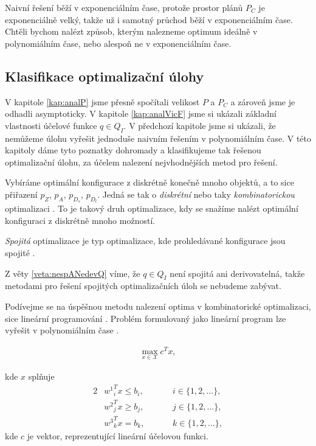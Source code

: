 Naivní řešení běží v exponenciálním čase, protože prostor plánů $P_C$ je exponenciálně velký, takže už i samotný průchod běží v exponenciálním čase.
Chtěli bychom nalézt způsob, kterým nalezneme optimum ideálně v polynomiálním čase, nebo alespoň ne v exponenciálním čase.

\subsection{Klasifikace optimalizační úlohy}\label{kap:NP}

V kapitole \ref{kap:analP} jsme přesně spočítali velikost $P$ a $P_C$ a zároveň jsme je odhadli asymptoticky.
V kapitole \ref{kap:analVicF} jsme si ukázali základní vlastnosti účelové funkce $q \in Q_I$.
V předchozí kapitole jsme si ukázali, že nemůžeme úlohu vyřešit jednoduše naivním řešením v polynomiálním čase.
V této kapitoly dáme tyto poznatky dohromady a klasifikujeme tak řešenou optimalizační úlohu, za účelem nalezení nejvhodnějších metod pro řešení.

Vybíráme optimální konfigurace z diskrétně konečně mnoho objektů, a to sice přiřazení $p_Z$, $p_A$, $p_{D_{s}}$, $p_{D_{l}}$.
Jedná se tak o \textit{diskrétní} nebo taky \textit{kombinatorickou} optimalizaci \cite{discrete}.
To je takový druh optimalizace, kdy se snažíme nalézt optimální konfiguraci z diskrétně mnoho možností.

\textit{Spojitá} optimalizace je typ optimalizace, kde prohledávané konfigurace jsou spojité \cite{continuos}.

Z věty \ref{veta:nespANedevQ} víme, že $q \in Q_I$ není spojitá ani derivovatelná, takže metodami pro řešení spojitých optimalizačních úloh se nebudeme zabývat.

Podívejme se na úspěšnou metodu nalezení optima v kombinatorické optimalizaci, sice lineární programování \cite{LP}.
Problém formulovaný jako lineární program lze vyřešit v polynomiálním čase \cite{cohen2020solving}.

\begin{definice}
  \begin{align*}
    \max_{x \in \mathcal{X}} c^T x,
  \end{align*}

  kde $x$ splňuje
  \begin{alignat*}{2}
    & {w^1}^T_i x \leq b_i, && \hspace{20pt} i \in \{ 1, 2, \dots \},\\
    & {w^2}^T_j x \geq b_j, && \hspace{20pt} j \in \{ 1, 2, \dots \},\\
    & {w^3}^T_k x = b_k,    && \hspace{20pt} k \in \{ 1, 2, \dots \},
  \end{alignat*}
  kde $c$ je vektor, reprezentující lineární účelovou funkci.
\end{definice}


